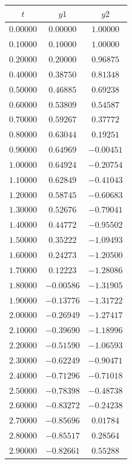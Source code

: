 \documentclass[a4paper,10pt]{article}
\begin{document}
\begin{center}
\begin{longtable}{ |c|c|c| } 
 \hline
 $t$ & $y1$ & $y2$\\
\hline
$   0.00000 $ & $   0.00000 $ & $  1.00000$\\
$   0.10000 $ & $  0.10000 $ & $  1.00000$\\
$   0.20000 $ & $  0.20000  $ & $ 0.96875$\\
$   0.40000 $ & $  0.38750  $ & $ 0.81348$\\
$   0.50000 $ & $  0.46885 $ & $ 0.69238$\\
$   0.60000 $ & $  0.53809  $ & $ 0.54587$\\
$   0.70000 $ & $  0.59267  $ & $ 0.37772$\\
$   0.80000  $ & $ 0.63044 $ & $  0.19251$\\
$   0.90000 $ & $  0.64969 $ & $ -0.00451$\\
$   1.00000 $ & $  0.64924 $ & $ -0.20754$\\
$   1.10000 $ & $  0.62849 $ & $ -0.41043$\\
$  1.20000 $ & $  0.58745 $ & $ -0.60683$\\
$   1.30000  $ & $ 0.52676 $ & $ -0.79041$\\
$   1.40000 $ & $  0.44772 $ & $ -0.95502$\\
$   1.50000 $ & $  0.35222 $ & $ -1.09493$\\
$   1.60000 $ & $  0.24273 $ & $ -1.20500$\\
$   1.70000  $ & $ 0.12223 $ & $ -1.28086$\\
$   1.80000 $ & $ -0.00586  $ & $-1.31905$\\
$   1.90000 $ & $ -0.13776 $ & $ -1.31722$\\
$   2.00000 $ & $ -0.26949 $ & $ -1.27417$\\
$   2.10000 $ & $ -0.39690 $ & $ -1.18996$\\
$  2.20000 $ & $ -0.51590 $ & $ -1.06593$\\
$   2.30000 $ & $ -0.62249 $ & $ -0.90471$\\
$   2.40000 $ & $ -0.71296  $ & $-0.71018$\\
$   2.50000 $ & $ -0.78398 $ & $ -0.48738$\\
$   2.60000 $ & $ -0.83272  $ & $-0.24238$\\
$   2.70000 $ & $ -0.85696 $ & $  0.01784$\\
$   2.80000 $ & $ -0.85517 $ & $  0.28564$\\
$   2.90000 $ & $ -0.82661 $ & $  0.55288$\\

\end{longtable}
\end{center}
\end{document}
